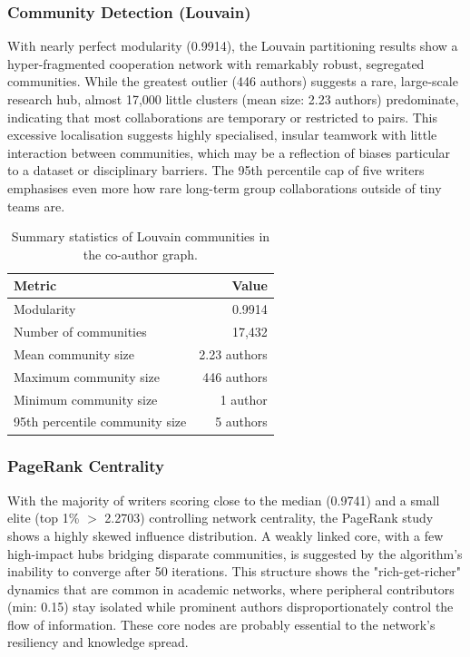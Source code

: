 \documentclass[conference]{IEEEtran}
\begin{document}
\subsubsection{\textbf{Community Detection (Louvain)}}
With nearly perfect modularity (0.9914), the Louvain partitioning results show a hyper-fragmented cooperation network with remarkably robust, segregated communities.  While the greatest outlier (446 authors) suggests a rare, large-scale research hub, almost 17,000 little clusters (mean size: 2.23 authors) predominate, indicating that most collaborations are temporary or restricted to pairs.  This excessive localisation suggests highly specialised, insular teamwork with little interaction between communities, which may be a reflection of biases particular to a dataset or disciplinary barriers.  The 95th percentile cap of five writers emphasises even more how rare long-term group collaborations outside of tiny teams are.

\begin{table}[htbp]  %
  \centering
  \begin{tabular}{lr}
    \toprule
    \textbf{Metric}                     & \textbf{Value}   \\
    \midrule
    Modularity                          & 0.9914           \\
    Number of communities               & 17{,}432         \\
    Mean community size                 & 2.23 authors     \\
    Maximum community size              & 446 authors      \\
    Minimum community size              & 1 author         \\
    95th percentile community size      & 5 authors        \\
    \bottomrule
  \end{tabular}
  \vspace{0.3cm}
  \caption{Summary statistics of Louvain communities in the co-author graph.}
  \label{tab:louvain}
\end{table}

\subsubsection{\textbf{PageRank Centrality}}
With the majority of writers scoring close to the median (0.9741) and a small elite (top 1\% $>$ 2.2703) controlling network centrality, the PageRank study shows a highly skewed influence distribution.  A weakly linked core, with a few high-impact hubs bridging disparate communities, is suggested by the algorithm's inability to converge after 50 iterations.  This structure shows the "rich-get-richer" dynamics that are common in academic networks, where peripheral contributors (min: 0.15) stay isolated while prominent authors disproportionately control the flow of information.  These core nodes are probably essential to the network's resiliency and knowledge spread.
\end{document}
